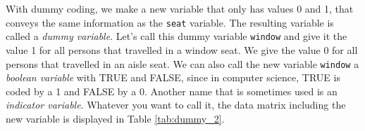 \begin{kframe}


{\ttfamily\noindent\bfseries{}}

{\ttfamily\noindent\bfseries\color{errorcolor}{\#\# Error in data.frame(person, seat, price): object 'price' not found}}

{\ttfamily\noindent\bfseries{}}\end{kframe}


With dummy coding, we make a new variable that only has values 0 and 1, that conveys the same information as the \texttt{seat} variable. The resulting variable is called a \textit{dummy variable}. Let's call this dummy variable \texttt{window} and give it the value 1 for all persons that travelled in a window seat. We give the value 0 for all persons that travelled in an aisle seat. We can also call the new variable \texttt{window} a \textit{boolean variable} with TRUE and FALSE, since in computer science, TRUE is coded by a 1 and FALSE by a 0. Another name that is sometimes used is an \textit{indicator variable}. Whatever you want to call it, the data matrix including the new variable is displayed in Table \ref{tab:dummy_2}.

\begin{kframe}


{\ttfamily\noindent\bfseries\color{errorcolor}{\#\# Error in data.frame(person, seat, window, price): object 'price' not found}}

{\ttfamily\noindent\bfseries{}}

{\ttfamily\noindent\bfseries\color{errorcolor}{\#\# Error in eval(predvars, data, env): object 'price' not found}}\end{kframe}

















































